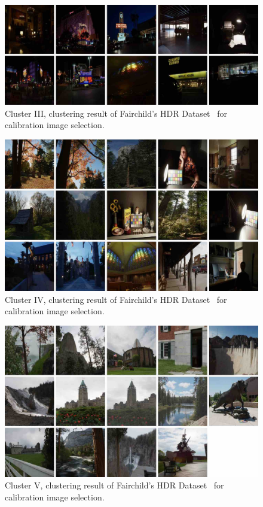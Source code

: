 \begin{figure}
\begin{center}
\includegraphics[width=\textwidth]{appendix1/cluster3_small.jpg}
\caption{Cluster III, clustering result of Fairchild's HDR Dataset~\cite{fairchild2007hdr} for calibration image selection.}
\end{center}
\end{figure}

\begin{figure}
\begin{center}
\includegraphics[width=\textwidth]{appendix1/cluster4_small.jpg}
\caption{Cluster IV, clustering result of Fairchild's HDR Dataset~\cite{fairchild2007hdr} for calibration image selection.}
\end{center}
\end{figure}

\begin{figure}
\begin{center}
\includegraphics[width=\textwidth]{appendix1/cluster5_small.jpg}
\caption{Cluster V, clustering result of Fairchild's HDR Dataset~\cite{fairchild2007hdr} for calibration image selection.}
\end{center}
\end{figure}

